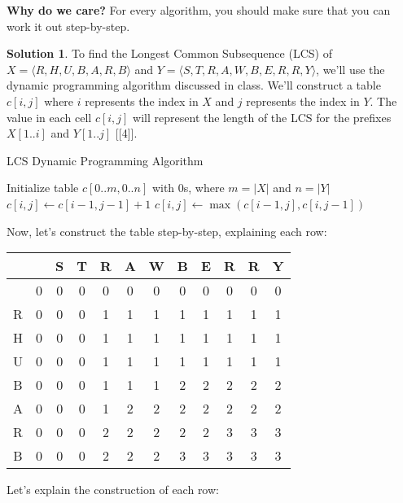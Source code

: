 \documentclass{article}
\theoremstyle{definition}
\newtheorem*{solution}{Solution}
\begin{document}
{\small \textbf{Why do we care?} For every algorithm, you should make
    sure that you can work it out step-by-step.} 
\begin{solution}
To find the Longest Common Subsequence (LCS) of $X = \langle R,H,U,B,A,R,B\rangle$ and $Y = \langle S,T,R,A,W,B,E,R,R,Y \rangle$, we'll use the dynamic programming algorithm discussed in class. We'll construct a table $c[i,j]$ where $i$ represents the index in $X$ and $j$ represents the index in $Y$. The value in each cell $c[i,j]$ will represent the length of the LCS for the prefixes $X[1..i]$ and $Y[1..j]$ [[4]].

\begin{algorithm}
\caption{LCS Dynamic Programming Algorithm}
\begin{algorithmic}[1]
\State Initialize table $c[0..m,0..n]$ with 0s, where $m = |X|$ and $n = |Y|$
            \State $c[i,j] \gets c[i-1,j-1] + 1$
        \Else
            \State $c[i,j] \gets \max(c[i-1,j], c[i,j-1])$
        \EndIf
    \EndFor
\EndFor
\end{algorithmic}
\end{algorithm}

Now, let's construct the table step-by-step, explaining each row:

\begin{center}
\begin{tabular}{|c|c|c|c|c|c|c|c|c|c|c|c|}
\hline
& & S & T & R & A & W & B & E & R & R & Y \\
\hline
& 0 & 0 & 0 & 0 & 0 & 0 & 0 & 0 & 0 & 0 & 0 \\
\hline
R & 0 & 0 & 0 & 1 & 1 & 1 & 1 & 1 & 1 & 1 & 1 \\
\hline
H & 0 & 0 & 0 & 1 & 1 & 1 & 1 & 1 & 1 & 1 & 1 \\
\hline
U & 0 & 0 & 0 & 1 & 1 & 1 & 1 & 1 & 1 & 1 & 1 \\
\hline
B & 0 & 0 & 0 & 1 & 1 & 1 & 2 & 2 & 2 & 2 & 2 \\
\hline
A & 0 & 0 & 0 & 1 & 2 & 2 & 2 & 2 & 2 & 2 & 2 \\
\hline
R & 0 & 0 & 0 & 2 & 2 & 2 & 2 & 2 & 3 & 3 & 3 \\
\hline
B & 0 & 0 & 0 & 2 & 2 & 2 & 3 & 3 & 3 & 3 & 3 \\
\hline
\end{tabular}
\end{center}

Let's explain the construction of each row:


\end{solution}
\end{document}
